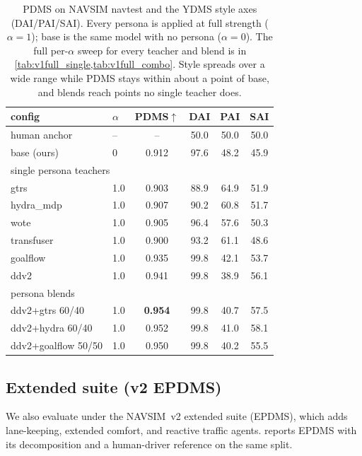 \begin{table}[t]
    \centering
    \small
    \setlength{\tabcolsep}{4pt}
    \begin{tabular}{llcccc}
        \toprule
        config & $\alpha$ & PDMS$\uparrow$ & DAI & PAI & SAI \\
        \midrule
        human anchor        & --  & --     & 50.0 & 50.0 & 50.0 \\
        base (ours)         & 0   & 0.912  & 97.6 & 48.2 & 45.9 \\
        \midrule
        \multicolumn{6}{l}{single persona teachers}\\
        gtrs                & 1.0 & 0.903  & 88.9 & 64.9 & 51.9 \\
        hydra\_mdp          & 1.0 & 0.907  & 90.2 & 60.8 & 51.7 \\
        wote                & 1.0 & 0.905  & 96.4 & 57.6 & 50.3 \\
        transfuser          & 1.0 & 0.900  & 93.2 & 61.1 & 48.6 \\
        goalflow            & 1.0 & 0.935  & 99.8 & 42.1 & 53.7 \\
        ddv2                & 1.0 & 0.941  & 99.8 & 38.9 & 56.1 \\
        \midrule
        \multicolumn{6}{l}{persona blends}\\
        ddv2+gtrs 60/40     & 1.0 & \textbf{0.954} & 99.8 & 40.7 & 57.5 \\
        ddv2+hydra 60/40    & 1.0 & 0.952  & 99.8 & 41.0 & 58.1 \\
        ddv2+goalflow 50/50 & 1.0 & 0.950  & 99.8 & 40.2 & 55.5 \\
        \bottomrule
    \end{tabular}
    \caption{PDMS on NAVSIM navtest and the YDMS style axes (DAI/PAI/SAI). Every
    persona is applied at full strength ($\alpha{=}1$); base is the same model with no
    persona ($\alpha{=}0$). The full per-$\alpha$ sweep for every teacher and blend is
    in \cref{tab:v1full_single,tab:v1full_combo}. Style spreads over a wide range while
    PDMS stays within about a point of base, and blends reach points no single teacher
    does.}
    \label{tab:v1}
\end{table}

\subsection{Extended suite (v2 EPDMS)}
\label{sec:exp:v2}
We also evaluate under the NAVSIM~v2 extended suite (EPDMS), which adds lane-keeping,
extended comfort, and reactive traffic agents.  reports EPDMS with its
decomposition and a human-driver reference on the same split.

